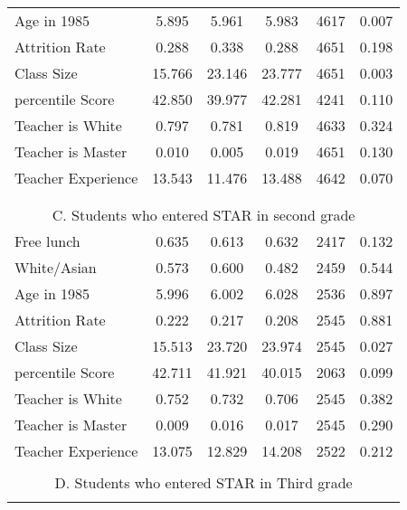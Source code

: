\documentclass{article}
\begin{document}
{{{{{{\begin{table}[htbp]
\begin{tabular}{llcccrc}
    \multicolumn{2}{l}{Age in 1985} & 5.895  & 5.961  & 5.983  & 4617  & 0.007  \\
    \multicolumn{2}{l}{Attrition Rate} & 0.288  & 0.338  & 0.288  & 4651  & 0.198  \\
    \multicolumn{2}{l}{Class Size} & 15.766  & 23.146  & 23.777  & 4651  & 0.003  \\
    \multicolumn{2}{l}{percentile Score} & 42.850  & 39.977  & 42.281  & 4241  & 0.110  \\
    \multicolumn{2}{l}{Teacher is White} & 0.797  & 0.781  & 0.819  & 4633  & 0.324  \\
    \multicolumn{2}{l}{Teacher is Master} & 0.010  & 0.005  & 0.019  & 4651  & 0.130  \\
    \multicolumn{2}{l}{Teacher Experience} & 13.543  & 11.476  & 13.488  & 4642  & 0.070  \\
          &       &       &       &       &       &  \\
          &       &       &       &       &       &  \\
    \multicolumn{7}{c}{C. Students who entered STAR in second grade} \\
    \multicolumn{2}{l}{Free lunch} & 0.635  & 0.613  & 0.632  & 2417  & 0.132  \\
    \multicolumn{2}{l}{White/Asian} & 0.573  & 0.600  & 0.482  & 2459  & 0.544  \\
    \multicolumn{2}{l}{Age in 1985} & 5.996  & 6.002  & 6.028  & 2536  & 0.897  \\
    \multicolumn{2}{l}{Attrition Rate} & 0.222  & 0.217  & 0.208  & 2545  & 0.881  \\
    \multicolumn{2}{l}{Class Size} & 15.513  & 23.720  & 23.974  & 2545  & 0.027  \\
    \multicolumn{2}{l}{percentile Score} & 42.711  & 41.921  & 40.015  & 2063  & 0.099  \\
    \multicolumn{2}{l}{Teacher is White} & 0.752  & 0.732  & 0.706  & 2545  & 0.382  \\
    \multicolumn{2}{l}{Teacher is Master} & 0.009  & 0.016  & 0.017  & 2545  & 0.290  \\
    \multicolumn{2}{l}{Teacher Experience} & 13.075  & 12.829  & 14.208  & 2522  & 0.212  \\
          &       &       &       &       &       &  \\
    \multicolumn{7}{c}{D. Students who entered STAR in Third grade} \\
          &       &       &       &       &       &  \\

\end{tabular}
\end{table}}}}}}}
\end{document}
